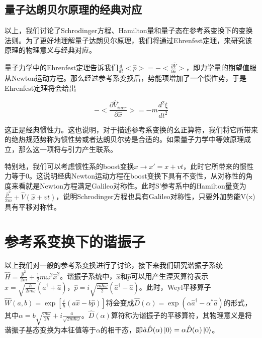 \documentclass[a4paper]{article}
\begin{document}
    \subsection{量子达朗贝尔原理的经典对应}

        以上，我们讨论了Schrodinger方程、Hamilton量和量子态在参考系变换下的变换法则。为了更好地理解量子达朗贝尔原理，我们将通过Ehrenfest定理，来研究该原理的物理意义与经典对应\cite{bib:eleven}。

        量子力学中的Ehrenfest定理告诉我们$\frac{d}{dt}<\hat{p}>=-<\frac{\partial\hat{V}}{\partial \hat{x}}>$，即力学量的期望值服从Newton运动方程。那么经过参考系变换后，势能项增加了一个惯性势，于是Ehrenfest定理将会给出
        
        \begin{equation}
            -<\frac{\partial\hat{V}_{iner}}{\partial \hat{x}}>=-m \frac{d^2\xi}{d t^2}
        \end{equation}
        
        这正是经典惯性力。这也说明，对于描述参考系变换的幺正算符，我们将它所带来的绝热规范势称为惯性势或者达朗贝尔势是合适的。如果量子力学中等效原理成立，那么这一项将与引力产生联系。
        
        特别地，我们可以考虑惯性系的boost变换$x\rightarrow x'=x+vt$，此时它所带来的惯性力等于0。这说明经典Newton运动方程在boost变换下具有不变性，从对称性的角度来看就是Newton方程满足Galileo对称性。此时S'参考系中的Hamilton量变为$\frac{\hat{p}^2}{2m}+\hat{V}(\hat{x}+vt)$，说明Schrodinger方程也具有Galileo对称性，只要外加势能V(x)具有平移对称性。



    \section{参考系变换下的谐振子}

        以上我们对一般的参考系变换进行了讨论，接下来我们研究谐振子系统$\hat{H}=\frac{\hat{p}^2}{2m}+\frac{1}{2}m\omega^2\hat{x}^2$。谐振子系统中，$\hat{x}$和$\hat{p}$可以用产生湮灭算符表示$\hat{x}=\sqrt{\frac{\hbar}{2m\omega}}(\hat{a}^\dagger+\hat{a})$，$\hat{p}=i\sqrt{\frac{m\hbar\omega}{2}}(\hat{a}^\dagger-\hat{a})$。此时，Weyl平移算子$\hat{W}(a,b)=\exp[\frac{i}{\hbar}(a\hat{x}-b\hat{p})]$将会变成$\hat{D}(\alpha)=\exp(\alpha\hat{a}^\dagger-\alpha^*\hat{a})$的形式，其中$\alpha=b\sqrt{\frac{m\omega}{2\hbar}}+i\frac{a}{\sqrt{2m\hbar\omega}}$。$\hat{D}(\alpha)$算符称为谐振子的平移算符，其物理意义是将谐振子基态变换为本征值等于$\alpha$的相干态，即$\hat{a}\hat{D}(\alpha)\ket{0}=\alpha\hat{D}(\alpha)\ket{0}$。
\end{document}
